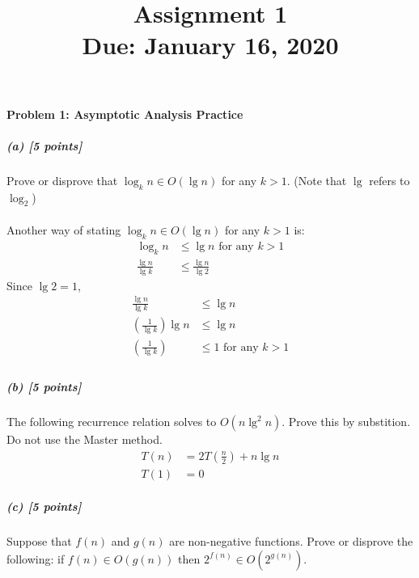 \documentclass[11pt]{article}
\title{\bf Assignment 1 \\[2ex]
\rm\normalsize Due: January 16, 2020}
\date{}
\author{}
\begin{document}
\maketitle

\begin{center}
\end{center}

\paragraph{Problem 1: Asymptotic Analysis Practice}
\subparagraph{(a) [5 points]}
Prove or disprove that $\log_k n \in O(\lg n)$ for any $k > 1$. (Note that $\lg$ refers to $\log_2$)
\\
\\
Another way of stating $\log_k n \in O(\lg n)$ for any $k > 1$ is:
\begin{align*}
\log_k n &\leq \lg n \text{ for any }  k > 1 \\
\frac{\lg n}{\lg k} &\leq \frac{\lg n}{\lg 2}
\end{align*}
Since $\lg 2 = 1$, \\
\begin{align*}
\frac{\lg n}{\lg k} &\leq \lg n \\ 
\left(\frac{1}{\lg k}\right)\lg n &\leq \lg n \\
\left(\frac{1}{\lg k}\right) &\leq 1 \text{ for any } k > 1 \\
\end{align*}


\subparagraph{(b) [5 points]}
The following recurrence relation solves to $O(n \lg^2 n)$. Prove this by substition. Do not use the Master method.
\begin{align*}
T(n) &= 2T\left( \frac n2 \right) + n \lg n \\
T(1) &= 0
\end{align*}
\subparagraph{(c) [5 points]}
Suppose that $f(n)$ and $g(n)$ are non-negative functions. Prove or disprove the following: if $f(n) \in O(g(n))$ then $2^{f(n)} \in O(2^{g(n)})$.
\end{document}
